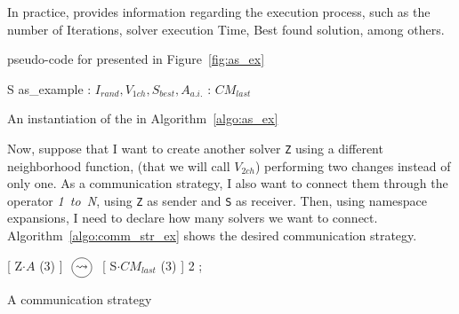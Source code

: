 In practice, \posl{} provides information regarding the execution process, such as the number of {\sc Iterations}, solver execution {\sc Time}, {\sc Best} found solution, among others.

\begin{algorithm}[H]
\dontprintsemicolon
\SetNoline
{}
\caption{\posl{} pseudo-code for \as{} presented in Figure~\ref{fig:as_ex}}\label{algo:as_ex}
\end{algorithm}	

\begin{algorithm}[H]
\dontprintsemicolon
\SetNoline
{}
 S  as\_example\;
 : $I_{rand}, V_{1ch}, S_{best}, A_{a.i.}$ \; 
: $CM_{last}$\; %
\caption{An instantiation of the \as{} in Algorithm~\ref{algo:as_ex}}\label{algo:cs_ex}
\end{algorithm}

Now, suppose that I want to create another solver \texttt{Z} using a different neighborhood function, (that we will call $V_{2ch}$) performing two changes instead of only one. As a communication strategy, I also want to connect them through the operator {\it 1~to~N}, using \texttt{Z} as sender and \texttt{S} as receiver. Then,  using namespace expansions,  I need to declare how many solvers we want to connect. Algorithm~\ref{algo:comm_str_ex} shows the desired communication strategy.

\begin{algorithm}[H]
\dontprintsemicolon
\SetNoline
[ Z$\cdot A$ (3) ] $\poslop{\rightsquigarrow}$ [ S$\cdot CM_{last}$ (3) ] 2 ;
\caption{A communication strategy}\label{algo:comm_str_ex}
\end{algorithm}


